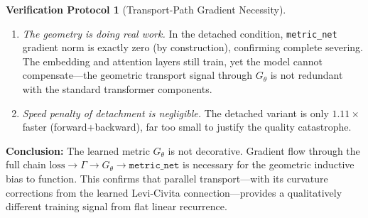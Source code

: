 \documentclass[11pt,a4paper]{article}
\theoremstyle{definition}
\newtheorem{protocol}[theorem]{Verification Protocol}
\theoremstyle{remark}
\begin{document}
\begin{protocol}[Transport-Path Gradient Necessity]
\begin{enumerate}[nosep]
  \item \emph{The geometry is doing real work.} In the detached 
  condition, \texttt{metric\_net} gradient norm is exactly zero 
  (by construction), confirming complete severing.  The embedding 
  and attention layers still train, yet the model cannot 
  compensate---the geometric transport signal through $G_\theta$ 
  is not redundant with the standard transformer components.
  
  \item \emph{Speed penalty of detachment is negligible.} The 
  detached variant is only $1.11\times$ faster (forward+backward), 
  far too small to justify the quality catastrophe.
\end{enumerate}

\textbf{Conclusion:} The learned metric $G_\theta$ is not 
decorative. Gradient flow through the full chain 
$\text{loss} \to \Gamma \to G_\theta \to \texttt{metric\_net}$ 
is necessary for the geometric inductive bias to function. 
This confirms that parallel transport---with its curvature 
corrections from the learned Levi-Civita connection---provides 
a qualitatively different training signal from flat linear 
recurrence.
\end{protocol}
\end{document}
